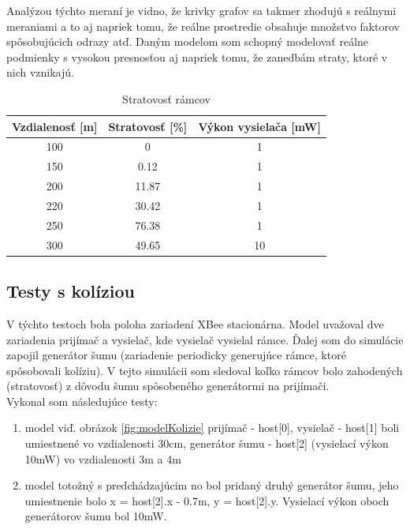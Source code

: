 \documentclass[11pt,twoside,a4paper]{book}
\begin{document}

Analýzou týchto meraní je vidno, že krivky grafov sa takmer zhodujú s reálnymi meraniami a to aj napriek tomu, že reálne prostredie obsahuje množstvo faktorov spôsobujúcich odrazy atď. Daným modelom som schopný modelovať reálne podmienky s vysokou presnosťou aj napriek tomu, že zanedbám straty, ktoré v nich vznikajú.

\begin{table}[htbp]
\begin{center}
\begin{tabular}{|c|c|c|}
\hline Vzdialenosť [m] & Stratovosť [\%] & Výkon vysielača [mW]\\ 
\hline 100 & 0 & 1\\ 
\hline 150 & 0.12 & 1\\ 
\hline 200 & 11.87 & 1\\ 
\hline 220 & 30.42 & 1\\ 
\hline 250 & 76.38 & 1\\
\hline 300 & 49.65 & 10\\  
\hline 
\end{tabular} 
\end{center}
\caption{Stratovosť rámcov}
\label{tab:stratovost1}
\end{table}

\subsection{Testy s kolíziou}
V týchto testoch bola poloha zariadení XBee stacionárna. Model uvažoval dve zariadenia prijímač a vysielač, kde vysielač vysielal rámce. Ďalej som do simulácie zapojil generátor šumu (zariadenie periodicky generujúce rámce, ktoré spôsobovali kolíziu). V tejto simulácii som sledoval koľko rámcov bolo zahodených (stratovosť) z dôvodu šumu spôsobeného generátormi na prijímači. \\

Vykonal som následujúce testy:
\begin{enumerate}
 \item model viď. obrázok \ref{fig:modelKolizie} prijímač - host[0], vysielač - host[1] boli umiestnené vo vzdialenosti 30cm, generátor šumu - host[2] (vysielací výkon 10mW) vo vzdialenosti 3m a 4m
 \item model totožný s predchádzajúcim no bol pridaný druhý generátor šumu, jeho umiestnenie bolo x = host[2].x - 0.7m, y = host[2].y. Vysielací výkon oboch generátorov šumu bol 10mW. 
\end{enumerate}
\end{document}

